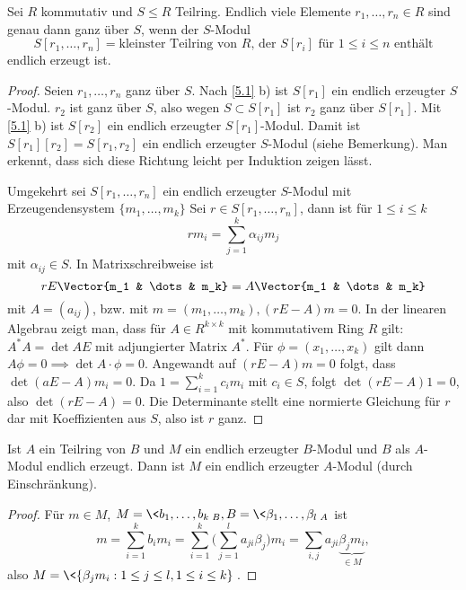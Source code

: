 \begin{st} \label{5.4}
	Sei $R$ kommutativ und $S \le R$ Teilring.
	Endlich viele Elemente $r_1, \dotsc, r_n \in R$ sind genau dann ganz über $S$, wenn der $S$-Modul
	\[
		S[r_1, \dotsc, r_n] = \text{kleinster Teilring von $R$, der $S[r_i]$ für $1 \le i \le n$ enthält}
	\]
	endlich erzeugt ist.
	\begin{proof}
		Seien $r_1, \dotsc, r_n$ ganz über $S$.
		Nach \ref{5.1} b) ist $S[r_1]$ ein endlich erzeugter $S$-Modul.
		$r_2$ ist ganz über $S$, also wegen $S \subset S[r_1]$ ist $r_2$ ganz über $S[r_1]$.
		Mit \ref{5.1} b) ist $S[r_2]$ ein endlich erzeugter $S[r_1]$-Modul.
		Damit ist $S[r_1][r_2] = S[r_1, r_2]$ ein endlich erzeugter $S$-Modul (siehe Bemerkung).
		Man erkennt, dass sich diese Richtung leicht per Induktion zeigen lässt.

		Umgekehrt sei $S[r_1, \dotsc, r_n]$ ein endlich erzeugter $S$-Modul mit Erzeugendensystem $\{m_1, \dotsc, m_k\}$
		Sei $r \in S[r_1, \dotsc, r_n]$, dann ist für $1 \le i \le k$
		\[
			rm_i = \sum_{j= 1}^k \alpha_{ij} m_j
		\]
		mit $\alpha_{ij} \in S$.
		In Matrixschreibweise ist
		\[
			r E \Vector{m_1 & \dots & m_k}
			= A \Vector{m_1 & \dots & m_k}
		\]
		mit $A = (a_{ij})$, bzw. mit $m = (m_1, \dotsc, m_k), (rE - A)m = 0$.
		In der linearen Algebrau zeigt man, dass für $A \in R^{k\times k}$ mit kommutativem Ring $R$ gilt: $A^* A = \det A E$ mit adjungierter Matrix $A^*$.
		Für $\phi = (x_1, \dotsc, x_k)$ gilt dann $A \phi = 0 \implies \det A \cdot \phi = 0$.
		Angewandt auf $(rE - A)m = 0$ folgt, dass $\det (aE - A) m_i = 0$.
		Da $1 = \sum_{i=1}^k c_i m_i$ mit $c_i \in S$, folgt $\det(rE - A) 1 = 0$, also $\det(rE - A) = 0$.
		Die Determinante stellt eine normierte Gleichung für $r$ dar mit Koeffizienten aus $S$, also ist $r$ ganz.
	\end{proof}
	\begin{note}
		Ist $A$ ein Teilring von $B$ und $M$ ein endlich erzeugter $B$-Modul und $B$ als $A$-Modul endlich erzeugt.
		Dann ist $M$ ein endlich erzeugter $A$-Modul (durch Einschränkung).
		\begin{proof}
			Für $m \in M$, $M = \<b_1, \dotsc, b_k\>_B, B = \<\beta_1, \dotsc, \beta_l\>_A$ ist
			\[
				m = \sum_{i=1}^k b_i m_i
				= \sum_{i=1}^k \Big( \sum_{j=1}^l a_{ji} \beta_j \Big) m_i
				= \sum_{i,j} a_{ji} \underbrace{\beta_j m_i}_{\in M},
			\]
			also $M = \< \{ \beta_j m_i : 1 \le j \le l, 1 \le i \le k \} \>$.
		\end{proof}
	\end{note}
\end{st}

